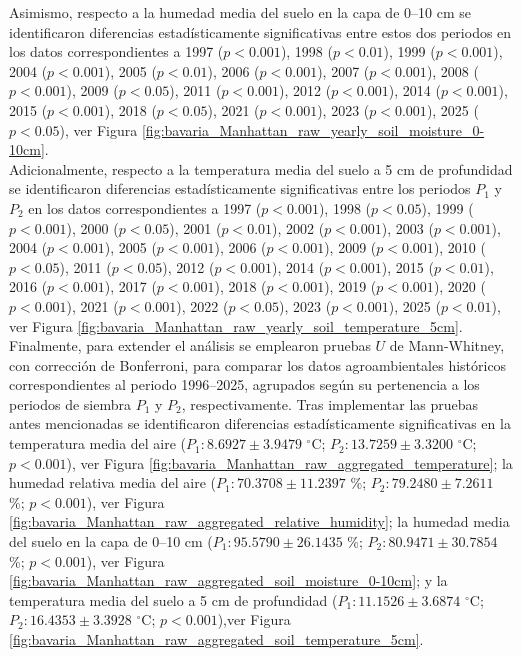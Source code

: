 Asimismo, respecto a la humedad media del suelo en la capa de 0--10 cm se identificaron diferencias estadísticamente significativas entre estos dos periodos en los datos correspondientes a 1997	($p<0.001$), 1998	($p<0.01$), 1999	($p<0.001$), 2004	($p<0.001$), 2005	($p<0.01$), 2006	($p<0.001$), 2007	($p<0.001$), 2008	($p<0.001$), 2009	($p<0.05$), 2011	($p<0.001$), 2012	($p<0.001$), 2014	($p<0.001$), 2015	($p<0.001$), 2018	($p<0.05$), 2021	($p<0.001$), 2023	($p<0.001$), 2025	($p<0.05$), ver Figura \ref{fig:bavaria_Manhattan_raw_yearly_soil_moisture_0-10cm}.\\

Adicionalmente, respecto a la temperatura media del suelo a 5 cm de profundidad se identificaron diferencias estadísticamente significativas entre los periodos $P_1$ y $P_2$ en los datos correspondientes a 1997	($p<0.001$), 1998	($p<0.05$), 1999	($p<0.001$), 2000	($p<0.05$), 2001	($p<0.01$), 2002	($p<0.001$), 2003	($p<0.001$), 2004	($p<0.001$), 2005	($p<0.001$), 2006	($p<0.001$), 2009	($p<0.001$), 2010	($p<0.05$), 2011	($p<0.05$), 2012	($p<0.001$), 2014	($p<0.001$), 2015	($p<0.01$), 2016	($p<0.001$), 2017	($p<0.001$), 2018	($p<0.001$), 2019	($p<0.001$), 2020	($p<0.001$), 2021	($p<0.001$), 2022	($p<0.05$), 2023	($p<0.001$), 2025	($p<0.01$), ver Figura \ref{fig:bavaria_Manhattan_raw_yearly_soil_temperature_5cm}.\\

Finalmente, para extender el análisis se emplearon pruebas $U$ de Mann-Whitney, con corrección de Bonferroni, para comparar los datos agroambientales históricos correspondientes al periodo 1996--2025, agrupados según su pertenencia a los periodos de siembra $P_1$ y $P_2$, respectivamente.  Tras implementar las pruebas antes mencionadas se identificaron diferencias estadísticamente significativas en la temperatura media del aire ($P_1:	8.6927	\pm	3.9479	$ $^\circ$C; 	$P_2:	13.7259	\pm	3.3200	$ $^\circ$C; 	$p<0.001$), ver Figura \ref{fig:bavaria_Manhattan_raw_aggregated_temperature}; la humedad relativa media del aire ($P_1:	70.3708	\pm	11.2397	$ \%; 	$P_2:	79.2480	\pm	7.2611	$ \%; 	$p<0.001$), ver Figura \ref{fig:bavaria_Manhattan_raw_aggregated_relative_humidity}; la humedad media del suelo en la capa de 0--10 cm  ($P_1:	95.5790	\pm	26.1435	$ \%; 	$P_2:	80.9471	\pm	30.7854	$ \%; 	$p<0.001$), ver Figura \ref{fig:bavaria_Manhattan_raw_aggregated_soil_moisture_0-10cm}; y la temperatura media del suelo a 5 cm de profundidad ($P_1:	11.1526	\pm	3.6874	$ $^\circ$C; 	$P_2:	16.4353	\pm	3.3928	$ $^\circ$C; 	$p<0.001$),ver Figura \ref{fig:bavaria_Manhattan_raw_aggregated_soil_temperature_5cm}.\\

